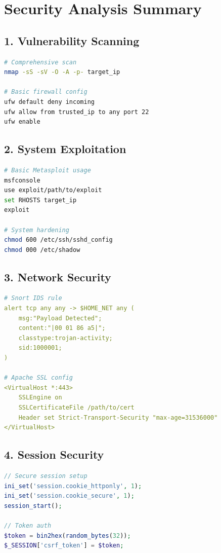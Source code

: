 \documentclass[12pt]{article}
\begin{document}
\section*{Security Analysis Summary}

\subsection*{1. Vulnerability Scanning}
\begin{lstlisting}[language=bash]
# Comprehensive scan
nmap -sS -sV -O -A -p- target_ip

# Basic firewall config
ufw default deny incoming
ufw allow from trusted_ip to any port 22
ufw enable
\end{lstlisting}

\subsection*{2. System Exploitation}
\begin{lstlisting}[language=bash]
# Basic Metasploit usage
msfconsole
use exploit/path/to/exploit
set RHOSTS target_ip
exploit

# System hardening
chmod 600 /etc/ssh/sshd_config
chmod 000 /etc/shadow
\end{lstlisting}

\subsection*{3. Network Security}
\begin{lstlisting}[language=yaml]
# Snort IDS rule
alert tcp any any -> $HOME_NET any (
    msg:"Payload Detected";
    content:"|00 01 86 a5|";
    classtype:trojan-activity;
    sid:1000001;
)

# Apache SSL config
<VirtualHost *:443>
    SSLEngine on
    SSLCertificateFile /path/to/cert
    Header set Strict-Transport-Security "max-age=31536000"
</VirtualHost>
\end{lstlisting}

\subsection*{4. Session Security}
\begin{lstlisting}[language=php]
// Secure session setup
ini_set('session.cookie_httponly', 1);
ini_set('session.cookie_secure', 1);
session_start();

// Token auth
$token = bin2hex(random_bytes(32));
$_SESSION['csrf_token'] = $token;
\end{lstlisting}
\end{document}
